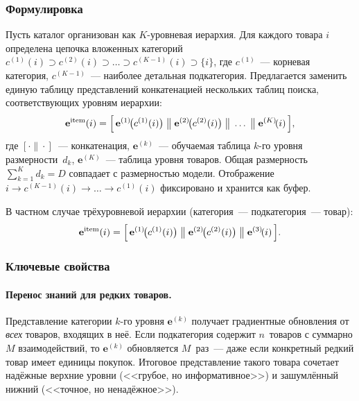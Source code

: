 \subsubsection{Формулировка}

Пусть каталог организован как $K$-уровневая иерархия. Для каждого товара $i$ определена
цепочка вложенных категорий $c^{(1)}(i) \supset c^{(2)}(i) \supset \ldots \supset c^{(K-1)}(i)
\supset \{i\}$, где $c^{(1)}$~--- корневая категория, $c^{(K-1)}$~--- наиболее детальная
подкатегория. Предлагается заменить единую таблицу представлений конкатенацией нескольких таблиц
поиска, соответствующих уровням иерархии:
\begin{equation}
  \mathbf{e}^{\mathrm{item}}(i)
  = \Bigl[\,
      \mathbf{e}^{(1)}\!\bigl(c^{(1)}(i)\bigr)
      \;\big\|\;
      \mathbf{e}^{(2)}\!\bigl(c^{(2)}(i)\bigr)
      \;\big\|\;
      \ldots
      \;\big\|\;
      \mathbf{e}^{(K)}\!(i)
    \,\Bigr],
  \label{eq:composite}
\end{equation}
где $[\cdot \| \cdot]$~--- конкатенация, $\mathbf{e}^{(k)}$~--- обучаемая таблица $k$-го
уровня размерности~$d_k$, $\mathbf{e}^{(K)}$~--- таблица уровня товаров. Общая размерность
$\sum_{k=1}^{K} d_k = D$ совпадает с размерностью модели. Отображение
$i \to c^{(K-1)}(i) \to \ldots \to c^{(1)}(i)$ фиксировано и хранится как буфер.

В частном случае трёхуровневой иерархии (категория~--- подкатегория~--- товар):
\begin{equation}
  \mathbf{e}^{\mathrm{item}}(i)
  = \Bigl[\,
      \mathbf{e}^{(1)}\!\bigl(c^{(1)}(i)\bigr)
      \;\big\|\;
      \mathbf{e}^{(2)}\!\bigl(c^{(2)}(i)\bigr)
      \;\big\|\;
      \mathbf{e}^{(3)}\!(i)
    \,\Bigr].
\end{equation}

\subsubsection{Ключевые свойства}

\paragraph{Перенос знаний для редких товаров.}
Представление категории $k$-го уровня $\mathbf{e}^{(k)}$ получает градиентные обновления от
\emph{всех} товаров, входящих в неё. Если подкатегория содержит $n$~товаров с суммарно $M$
взаимодействий, то $\mathbf{e}^{(k)}$ обновляется $M$~раз~--- даже если конкретный редкий товар
имеет единицы покупок. Итоговое представление такого товара сочетает надёжные верхние уровни
(<<грубое, но информативное>>) и зашумлённый нижний (<<точное, но ненадёжное>>).

